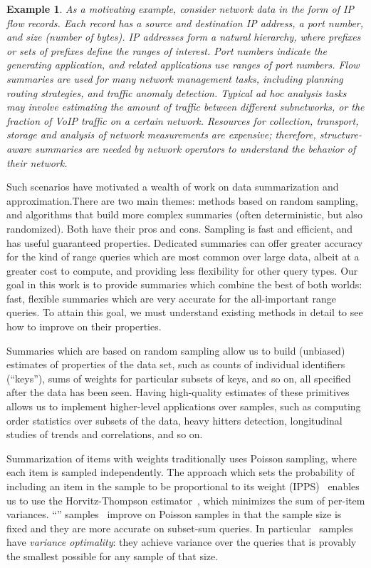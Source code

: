 \documentclass[11pt]{article}
\newtheorem{example}{Example}
\begin{document}
\begin{example}
\label{eg:motivate}
As a motivating example, consider network data in the form
of IP flow records.
Each record has a source and destination IP address, a port number, and
size (number of bytes).  
IP addresses form a natural hierarchy, where prefixes or sets of prefixes 
define the ranges of interest.  
Port numbers indicate the generating application, and 
related applications use ranges of port numbers. 
Flow summaries are used for many network management tasks,
including planning routing strategies, and traffic anomaly detection.
Typical ad hoc analysis tasks may involve 
 estimating the amount of traffic between different
subnetworks, or the fraction of VoIP traffic on a certain network. 
Resources for collection, transport, storage and analysis of network
measurements are expensive; therefore, 
structure-aware summaries are needed by network operators to
understand the behavior of their network. 
\end{example}

Such scenarios have motivated a wealth of work on data summarization and
approximation.There are two main themes: 
methods based on random sampling, and algorithms that build more complex
summaries (often deterministic, but also randomized). 
Both have their pros and cons.
Sampling is fast and efficient, and has
useful guaranteed properties.
Dedicated summaries can offer
greater accuracy for the kind of range queries which are most common
over large data, albeit at a greater cost to compute, and providing
less flexibility for other query types. 
Our goal in this work is to provide summaries which combine the best
of both worlds: fast, flexible summaries which are very accurate for
the all-important range queries. 
To attain this goal, we must understand existing methods in detail to
see how to improve on their properties. 

Summaries which are based on random sampling 
allow us to build (unbiased) estimates of properties of the data set, 
such as counts of individual identifiers (``keys''), sums of weights
for particular subsets of keys, and so on, all specified after the
data has been seen. 
Having high-quality estimates of these primitives allows us to
implement higher-level applications over samples, such as
computing order statistics over subsets of the data, heavy hitters
detection, longitudinal studies of trends and correlations, and so
on. 

Summarization of items with weights  traditionally uses Poisson
sampling, where each item is sampled independently. 
The approach which sets the probability of including an item in the
sample to be proportional to its weight (IPPS)~\cite{Hajekbook1981}
enables us to use the Horvitz-Thompson estimator~\cite{HT52}, 
which minimizes the sum of per-item variances.
``\varopt'' samples~\cite{Cha82,Tille:book,varopt:CDKLT08}
improve on Poisson samples in that the sample size is fixed and 
they are more accurate on subset-sum queries. 
In particular \varopt\ samples have 
{\em variance optimality}: they achieve variance over the
queries that is provably the smallest possible for any sample of that
size. 
\end{document}
